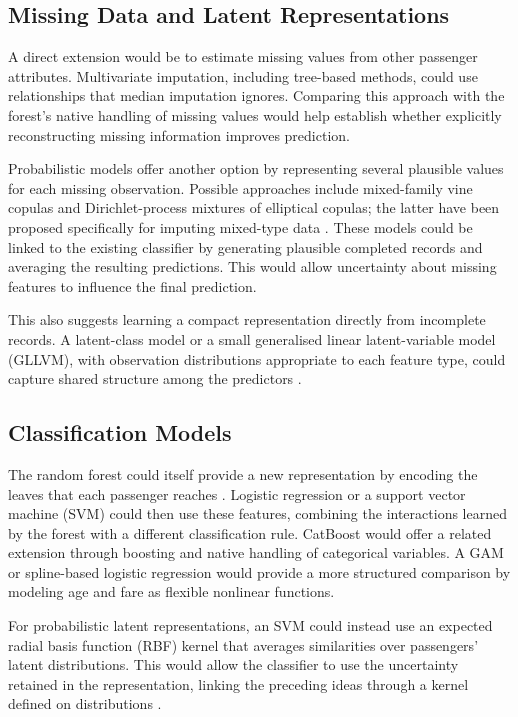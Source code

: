 \documentclass[11pt,a4paper]{article}
\begin{document}
\subsection{Missing Data and Latent Representations}

A direct extension would be to estimate missing values from other passenger attributes. Multivariate imputation, including tree-based methods, could use relationships that median imputation ignores. Comparing this approach with the forest's native handling of missing values would help establish whether explicitly reconstructing missing information improves prediction.

Probabilistic models offer another option by representing several plausible values for each missing observation. Possible approaches include mixed-family vine copulas and Dirichlet-process mixtures of elliptical copulas; the latter have been proposed specifically for imputing mixed-type data \cite{wang-copula-imputation}. These models could be linked to the existing classifier by generating plausible completed records and averaging the resulting predictions. This would allow uncertainty about missing features to influence the final prediction.

This also suggests learning a compact representation directly from incomplete records. A latent-class model or a small generalised linear latent-variable model (GLLVM), with observation distributions appropriate to each feature type, could capture shared structure among the predictors \cite{niku-gllvm}.

\subsection{Classification Models}

The random forest could itself provide a new representation by encoding the leaves that each passenger reaches \cite{forest-feature-transformation}. Logistic regression or a support vector machine (SVM) could then use these features, combining the interactions learned by the forest with a different classification rule. CatBoost would offer a related extension through boosting and native handling of categorical variables. A GAM or spline-based logistic regression would provide a more structured comparison by modeling age and fare as flexible nonlinear functions.

For probabilistic latent representations, an SVM could instead use an expected radial basis function (RBF) kernel that averages similarities over passengers' latent distributions. This would allow the classifier to use the uncertainty retained in the representation, linking the preceding ideas through a kernel defined on distributions \cite{sriperumbudur-distributions}.
\end{document}
